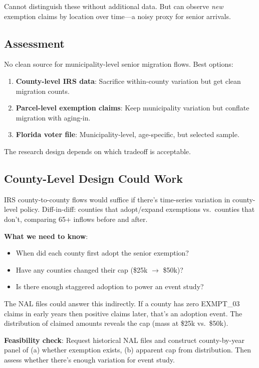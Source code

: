 \documentclass[11pt]{article}
\begin{document}
Cannot distinguish these without additional data. But can observe \textit{new} exemption claims by location over time---a noisy proxy for senior arrivals.

\subsection{Assessment}

No clean source for municipality-level senior migration flows. Best options:
\begin{enumerate}
    \item \textbf{County-level IRS data}: Sacrifice within-county variation but get clean migration counts.
    \item \textbf{Parcel-level exemption claims}: Keep municipality variation but conflate migration with aging-in.
    \item \textbf{Florida voter file}: Municipality-level, age-specific, but selected sample.
\end{enumerate}

The research design depends on which tradeoff is acceptable.

\subsection{County-Level Design Could Work}

IRS county-to-county flows would suffice if there's time-series variation in county-level policy. Diff-in-diff: counties that adopt/expand exemptions vs.\ counties that don't, comparing 65+ inflows before and after.

\textbf{What we need to know}:
\begin{itemize}
    \item When did each county first adopt the senior exemption?
    \item Have any counties changed their cap (\$25k $\to$ \$50k)?
    \item Is there enough staggered adoption to power an event study?
\end{itemize}

The NAL files could answer this indirectly. If a county has zero EXMPT\_03 claims in early years then positive claims later, that's an adoption event. The distribution of claimed amounts reveals the cap (mass at \$25k vs.\ \$50k).

\textbf{Feasibility check}: Request historical NAL files and construct county-by-year panel of (a) whether exemption exists, (b) apparent cap from distribution. Then assess whether there's enough variation for event study.
\end{document}
